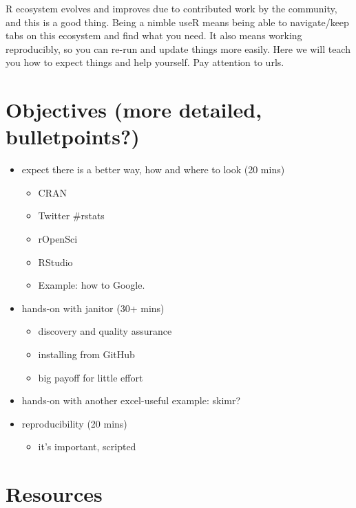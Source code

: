 \documentclass[]{book}
\providecommand{\tightlist}{%
  \setlength{\itemsep}{0pt}\setlength{\parskip}{0pt}}
\begin{document}
R ecosystem evolves and improves due to contributed work by the community, and this is a good thing. Being a nimble useR means being able to navigate/keep tabs on this ecosystem and find what you need. It also means working reproducibly, so you can re-run and update things more easily. Here we will teach you how to expect things and help yourself. Pay attention to urls.

\hypertarget{objectives-more-detailed-bulletpoints-3}{%
\section{Objectives (more detailed, bulletpoints?)}\label{objectives-more-detailed-bulletpoints-3}}

\begin{itemize}
\tightlist
\item
  expect there is a better way, how and where to look (20 mins)

  \begin{itemize}
  \tightlist
  \item
    CRAN
  \item
    Twitter \#rstats
  \item
    rOpenSci
  \item
    RStudio
  \item
    Example: how to Google.
  \end{itemize}
\item
  hands-on with janitor (30+ mins)

  \begin{itemize}
  \tightlist
  \item
    discovery and quality assurance
  \item
    installing from GitHub
  \item
    big payoff for little effort
  \end{itemize}
\item
  hands-on with another excel-useful example: skimr?\\
\item
  reproducibility (20 mins)

  \begin{itemize}
  \tightlist
  \item
    it's important, scripted
  \end{itemize}
\end{itemize}

\hypertarget{resources-5}{%
\section{Resources}\label{resources-5}}
\end{document}
